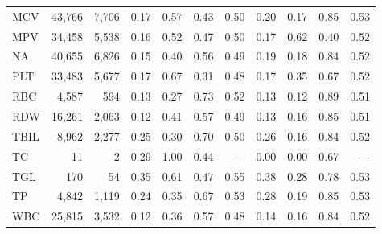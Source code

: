 \begin{table}[ht]
\begin{tabular}{lrrrrrrrrrr}
MCV & 43,766 & 7,706 & 0.17 & 0.57 & 0.43 & 0.50 & 0.20 & 0.17 & 0.85 & 0.53 \\
MPV & 34,458 & 5,538 & 0.16 & 0.52 & 0.47 & 0.50 & 0.17 & 0.62 & 0.40 & 0.52 \\
NA & 40,655 & 6,826 & 0.15 & 0.40 & 0.56 & 0.49 & 0.19 & 0.18 & 0.84 & 0.52 \\
PLT & 33,483 & 5,677 & 0.17 & 0.67 & 0.31 & 0.48 & 0.17 & 0.35 & 0.67 & 0.52 \\
RBC & 4,587 & 594 & 0.13 & 0.27 & 0.73 & 0.52 & 0.13 & 0.12 & 0.89 & 0.51 \\
RDW & 16,261 & 2,063 & 0.12 & 0.41 & 0.57 & 0.49 & 0.13 & 0.16 & 0.85 & 0.51 \\
TBIL & 8,962 & 2,277 & 0.25 & 0.30 & 0.70 & 0.50 & 0.26 & 0.16 & 0.84 & 0.52 \\
TC & 11 & 2 & 0.29 & 1.00 & 0.44 & --- & 0.00 & 0.00 & 0.67 & --- \\
TGL & 170 & 54 & 0.35 & 0.61 & 0.47 & 0.55 & 0.38 & 0.28 & 0.78 & 0.53 \\
TP & 4,842 & 1,119 & 0.24 & 0.35 & 0.67 & 0.53 & 0.28 & 0.19 & 0.85 & 0.53 \\
WBC & 25,815 & 3,532 & 0.12 & 0.36 & 0.57 & 0.48 & 0.14 & 0.16 & 0.84 & 0.52 \\
\bottomrule
\end{tabular}
\label{tab:12_eval_detail_eicu_sepsis}
\end{table}